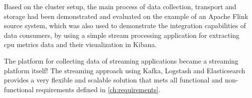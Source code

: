 Based on the cluster setup, the main process of data collection, transport and storage had been demonstrated and evaluated on the example of
an Apache Flink source system, which was also used to demonstrate the integration capabilities of data consumers, by using a simple
stream processing application for extracting cpu metrics data and their visualization in Kibana.

The platform for collecting data of streaming applications became a streaming platform itself! The streaming approach using Kafka,
Logstash and Elasticsearch provides a very flexible and scalable solution that mets all functional and non-functional requirements defined in \autoref{ch:requirements}.